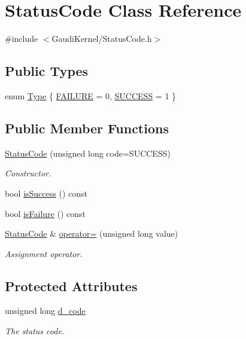 \hypertarget{classStatusCode}{
\section{StatusCode Class Reference}
\label{classStatusCode}
}


{\ttfamily \#include $<$GaudiKernel/StatusCode.h$>$}\subsection*{Public Types}
\begin{DoxyCompactItemize}
\item 
enum \hyperlink{classStatusCode_a6f565cbeadc76d14c72f047e5e85eb4b}{Type} \{ \hyperlink{classStatusCode_a6f565cbeadc76d14c72f047e5e85eb4ba3da73d4c469762eb9d3c960368252b26}{FAILURE} =  0, 
\hyperlink{classStatusCode_a6f565cbeadc76d14c72f047e5e85eb4badd0da38d3ba0d922efd1f4619bc37ad8}{SUCCESS} =  1
 \}
\end{DoxyCompactItemize}
\subsection*{Public Member Functions}
\begin{DoxyCompactItemize}
\item 
\hyperlink{classStatusCode_aaf803a555dd2d841418328a747059b3e}{StatusCode} (unsigned long code=SUCCESS)
\begin{DoxyCompactList}\small\item\em Constructor. \item\end{DoxyCompactList}\item 
bool \hyperlink{classStatusCode_aa9517f7106b77565d0eda20a9b37e705}{isSuccess} () const 
\item 
bool \hyperlink{classStatusCode_aa5d4d426deef86d8595b08abf6efa5f7}{isFailure} () const 
\item 
\hyperlink{classStatusCode}{StatusCode} \& \hyperlink{classStatusCode_af5179c5605558840cefe14e2794265de}{operator=} (unsigned long value)
\begin{DoxyCompactList}\small\item\em Assignment operator. \item\end{DoxyCompactList}\end{DoxyCompactItemize}
\subsection*{Protected Attributes}
\begin{DoxyCompactItemize}
\item 
unsigned long \hyperlink{classStatusCode_aff37ebcb323b897044b42d303cf72d93}{d\_\-code}
\begin{DoxyCompactList}\small\item\em The status code. \item\end{DoxyCompactList}\end{DoxyCompactItemize}


